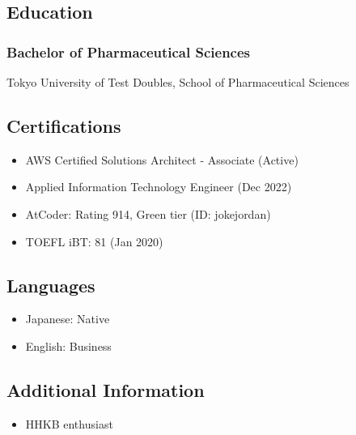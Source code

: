 \documentclass[
  10pt,
  a4paper,
]{extarticle}
\providecommand{\tightlist}{%
  \setlength{\itemsep}{0pt}\setlength{\parskip}{0pt}}
\begin{document}
\subsection{Education}\label{education}

\subsubsection{Bachelor of Pharmaceutical
Sciences}\label{bachelor-of-pharmaceutical-sciences}

Tokyo University of Test Doubles, School of Pharmaceutical Sciences

%
  {\selectfont
  \noindent{}}\par{}

\subsection{Certifications}\label{certifications}

\begin{itemize}
\tightlist
\item
  AWS Certified Solutions Architect - Associate (Active)
\item
  Applied Information Technology Engineer (Dec 2022)
\item
  AtCoder: Rating 914, Green tier (ID: jokejordan)
\item
  TOEFL iBT: 81 (Jan 2020)
\end{itemize}

\subsection{Languages}\label{languages}

\begin{itemize}
\tightlist
\item
  Japanese: Native
\item
  English: Business
\end{itemize}

\subsection{Additional Information}\label{additional-information}

\begin{itemize}
\tightlist
\item
  HHKB enthusiast
\end{itemize}
\end{document}

